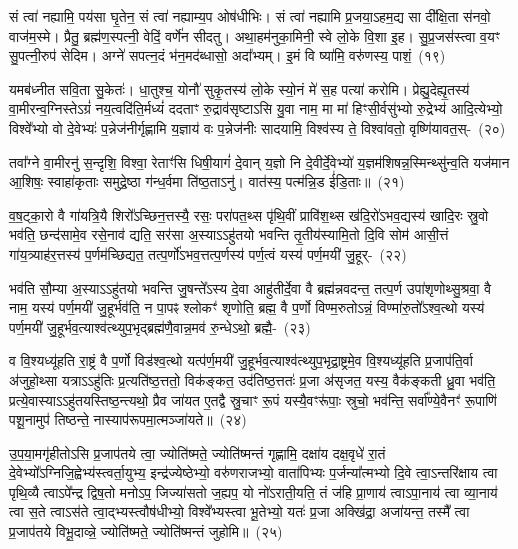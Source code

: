 सं त्वा॑ नह्यामि॒ पय॑सा घृ॒तेन॒ सं त्वा॑ नह्याम्य॒प ओष॑धीभिः। सं त्वा॑ नह्यामि प्र॒जया॒\-ऽहम॒द्य सा दी᳚क्षि॒ता स॑नवो॒ वाज॑म॒स्मे। प्रैतु॒ ब्रह्म॑ण॒स्पत्नी॒ वेदिं॒ वर्णे॑न सीदतु। अथा॒हम॑नुका॒मिनी॒ स्वे लो॒के वि॒शा इ॒ह। सु॒प्र॒जस॑स्त्वा व॒यꣳ सु॒पत्नी॒रुप॑ सेदिम। अग्ने॑ सपत्न॒दं भ॑न॒मद॑ब्धासो॒ अदा᳚भ्यम्। इ॒मं वि ष्या॑मि॒ वरु॑णस्य॒ पाशं॒~(१९)\ip

यमब॑ध्नीत सवि॒ता सु॒केतः॑। धा॒तुश्च॒ योनौ॑ सुकृ॒तस्य॑ लो॒के स्यो॒नं मे॑ स॒ह पत्या॑ करोमि। प्रेह्यु॒देह्यृ॒तस्य॑ वा॒मीरन्व॒ग्निस्ते\-ऽग्रं॑ नय॒त्वदि॑ति॒र्मध्यं॑ ददताꣳ रु॒द्राव॑सृष्टाऽसि यु॒वा नाम॒ मा मा॑ हिꣳसी॒र्वसु॑भ्यो रु॒द्रेभ्य॑ आदि॒त्येभ्यो॒ विश्वे᳚भ्यो वो दे॒वेभ्यः॑ प॒न्ने\-ज॑नीर्गृह्णामि य॒ज्ञाय॑ वः प॒न्ने\-ज॑नीः सादयामि॒ विश्व॑स्य ते॒ विश्वा॑वतो॒ वृष्णि॑यावत॒स्-~(२०)\ip

तवा᳚ग्ने वा॒मीरनु॑ स॒न्दृशि॒ विश्वा॒ रेताꣳ॑सि धिषी॒यागं॑ दे॒वान् य॒ज्ञो नि दे॒वीर्दे॒वेभ्यो॑ य॒ज्ञम॑शिषन्न॒स्मिन्थ्सु॑न्व॒ति यज॑मान आ॒शिषः॒ स्वाहा॑कृताः समुद्रे॒ष्ठा ग॑न्ध॒र्वमा ति॑ष्ठ॒ता\-ऽनु॑। वात॑स्य॒ पत्म॑न्नि॒ड ई॑डि॒ताः॥~(२१)\ip

{\anuvakamend[{पाशं॒ वृष्णि॑यावतस्त्रि॒ꣳ॒शच्च॑}]}

व॒ष॒ट्का॒रो वै गा॑यत्रि॒यै शिरो᳚\-ऽच्छिन॒त्तस्यै॒ रसः॒ परा॑पत॒थ्स पृ॑थि॒वीं प्रावि॑श॒थ्स ख॑दि॒रो॑\-ऽभव॒द्यस्य॑ खादि॒रः स्रु॒वो भव॑ति॒ छन्द॑सामे॒व रसे॒नाव॑ द्यति॒ सर॑सा अ॒स्या\-ऽऽ\-हु॑तयो भवन्ति तृ॒तीय॑स्यामि॒तो दि॒वि सोम॑ आसी॒त्तं गा॑य॒त्र्याह॑र॒त्तस्य॑ प॒र्णम॑च्छिद्यत॒ तत्प॒र्णो॑\-ऽभव॒त्तत्प॒र्णस्य॑ पर्ण॒त्वं यस्य॑ पर्ण॒मयी॑ जु॒हूर्-~(२२)\ip

भव॑ति सौ॒म्या अ॒स्या\-ऽऽ\-हु॑तयो भवन्ति जु॒षन्ते᳚\-ऽस्य दे॒वा आहु॑तीर्दे॒वा वै ब्रह्म॑न्नवदन्त॒ तत्प॒र्ण उपा॑शृणोथ्सु॒श्रवा॒ वै नाम॒ यस्य॑ पर्ण॒मयी॑ जु॒हूर्भव॑ति॒ न पा॒पꣴ श्लोकꣳ॑ शृणोति॒ ब्रह्म॒ वै प॒र्णो विण्म॒रुतो\-ऽन्नं॒ विण्मा॑रु॒तो᳚\-ऽश्व॒त्थो यस्य॑ पर्ण॒मयी॑ जु॒हूर्भव॒त्याश्व॑त्थ्युप॒भृद्ब्रह्म॑णै॒वान्न॒मव॑ रु॒न्धे\-ऽथो॒ ब्रह्मै॒-~(२३)\ip

व वि॒श्यध्यू॑हति रा॒ष्ट्रं वै प॒र्णो विड॑श्व॒त्थो यत्प॑र्ण॒मयी॑ जु॒हूर्भव॒त्याश्व॑त्थ्युप॒भृद्रा॒ष्ट्रमे॒व वि॒श्यध्यू॑हति प्र॒जा\-प॑ति॒र्वा अ॑जुहो॒थ्सा यत्रा\-ऽऽ\-हु॑तिः प्र॒त्यति॑ष्ठ॒त्ततो॒ विक॑ङ्कत॒ उद॑तिष्ठ॒त्ततः॑ प्र॒जा अ॑सृजत॒ यस्य॒ वैक॑ङ्कती ध्रु॒वा भव॑ति॒ प्रत्ये॒वास्या\-ऽऽ\-हु॑तयस्तिष्ठ॒न्त्यथो॒ प्रैव जा॑यत ए॒तद्वै स्रु॒चाꣳ रू॒पं यस्यै॒वꣳरू॑पाः॒ स्रुचो॒ भव॑न्ति॒ सर्वा᳚ण्ये॒वैनꣳ॑ रू॒पाणि॑ पशू॒नामुप॑ तिष्ठन्ते॒ नास्याप॑रूपमा॒त्मञ्जा॑यते॥~(२४)\ip

{\anuvakamend[{जु॒हूरथो॒ ब्रह्म॑ स्रु॒चाꣳ स॒प्तद॑श च}]}

उ॒प॒या॒मगृ॑हीतो\-ऽसि प्र॒जा\-प॑तये त्वा॒ ज्योति॑ष्मते॒ ज्योति॑ष्मन्तं गृह्णामि॒ दक्षा॑य दक्ष॒वृधे॑ रा॒तं दे॒वेभ्यो᳚\-ऽग्निजि॒ह्वेभ्य॑\-स्त्वर्ता॒युभ्य॒ इन्द्र॑ज्येष्ठेभ्यो॒ वरु॑णराजभ्यो॒ वाता॑पिभ्यः प॒र्जन्या᳚त्मभ्यो दि॒वे त्वा॒ऽन्तरि॑क्षाय त्वा पृथि॒व्यै त्वा\-ऽपे᳚न्द्र द्विष॒तो मनो\-ऽप॒ जिज्या॑सतो ज॒ह्यप॒ यो नो॑\-ऽराती॒यति॒ तं ज॑हि प्रा॒णाय॑ त्वा\-ऽपा॒नाय॑ त्वा व्या॒नाय॑ त्वा स॒ते त्वा\-ऽस॑ते त्वा॒द्भ्यस्त्वौष॑धीभ्यो॒ विश्वे᳚भ्यस्त्वा भू॒तेभ्यो॒ यतः॑ प्र॒जा अक्खि॑द्रा॒ अजा॑यन्त॒ तस्मै᳚ त्वा प्र॒जा\-प॑तये विभू॒दाव्न्ने॒ ज्योति॑ष्मते॒ ज्योति॑ष्मन्तं जुहोमि॥~(२५)\ip

